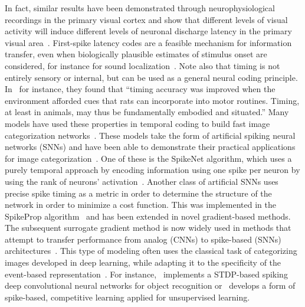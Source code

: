 \documentclass[brainsci, %
               review,submit,pdftex,moreauthors
               ]{Definitions/mdpi}
\newcommand{\mynote}[1]{{\sethlcolor{yellow}\hl{#1}}}
\begin{document}
In fact, similar results have been demonstrated through neurophysiological recordings in the primary visual cortex and show that different levels of visual activity will induce different levels of neuronal discharge latency in the primary visual area~\citep{celebrini_dynamics_1993}. First-spike latency codes are a feasible mechanism for information transfer, even when biologically plausible estimates of stimulus onset are considered, for instance for sound localization~\citep{chase_first-spike_2007}.  Note also that timing is not entirely sensory or internal, but can be used as a general neural coding principle. In~\citep{safaie_turning_2020} for instance, they found that ``timing accuracy was improved when the environment afforded cues that rats can incorporate into motor routines. Timing, at least in animals, may thus be fundamentally embodied and situated.''  Many models have used these properties in temporal coding to build fast image categorization networks~\citep{gautrais_rate_1998,delorme_spikenet_1999, perrinet_coding_2004}. These models take the form of artificial spiking neural networks (SNNs) and have been able to demonstrate their practical applications for image categorization~\citep{delorme_ultra-rapid_2000}. One of these is the SpikeNet algorithm, which uses a purely temporal approach by encoding information using one spike per neuron by using the rank of neurons' activation~\citep{delorme_spikenet_1999,bonilla_analyzing_2022}. Another class of artificial SNNs uses precise spike timing as a metric in order to determine the structure of the network in order to minimize a cost function. This was implemented in the SpikeProp algorithm~\citep{bohte_error-backpropagation_2002} and has been extended in novel gradient-based methods. The subsequent surrogate gradient method is now widely used in methods that attempt to transfer performance from analog (CNNs) to spike-based (SNNs) architectures~\citep{zenke_remarkable_2021}. This type of modeling often uses the classical task of categorizing images developed in deep learning, while adapting it to the specificity of the event-based representation~\citep{goltz_fast_2021}. For instance,~\citep{kheradpisheh_stdp-based_2018} implements a STDP-based spiking deep convolutional neural networks for object recognition or~\citep{tavanaei_representation_2018} develops a form of spike-based, competitive learning applied for unsupervised learning. 
\end{document}
